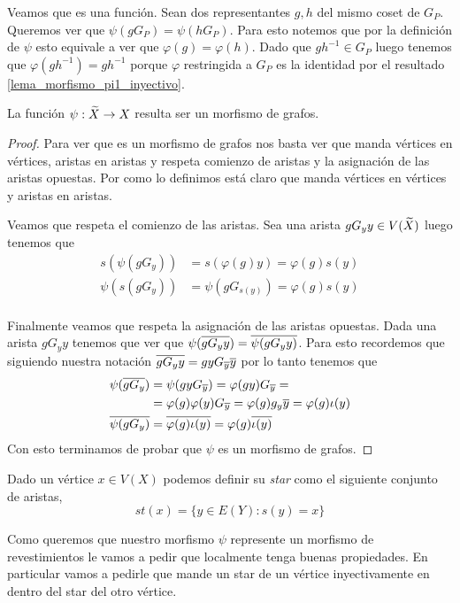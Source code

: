 \documentclass[tesis.tex]{subfiles}
\begin{document}
Veamos que es una función.
Sean dos representantes $g,h$ del mismo coset de $G_P$. 
Queremos ver que $\psi(gG_P) = \psi(hG_P)$.
Para esto notemos que por la definición de $\psi$  esto equivale a ver que $\varphi(g) = \varphi(h)$.
Dado que $gh^{-1} \in G_P$ luego tenemos que $\varphi(gh^{-1}) = gh^{-1}$ porque $\varphi$ restringida a $G_P$ es la identidad por el resultado \ref{lema_morfismo_pi1_inyectivo}.

\begin{lema}
	La función $\psi: \widetilde X \to X$ resulta ser un morfismo de grafos.
\end{lema}

\begin{proof}
Para ver que es un morfismo de grafos nos basta ver que manda vértices en vértices, aristas en aristas y respeta comienzo de aristas y la asignación de las aristas opuestas.
Por como lo definimos está claro que manda vértices en vértices y aristas en aristas.

Veamos que respeta el comienzo de las aristas.
Sea una arista $gG_y y \in V(\widetilde X)$ luego tenemos que 
\begin{align*}
s(\psi(gG_y  )) &= s (\varphi(g)  y) =  \varphi(g) s(y) 	\\ 
\psi(s(gG_y ))  &= \psi(gG_{s(y)} ) = \varphi(g){s(y)} \\
\end{align*}	

Finalmente veamos que respeta la asignación de las aristas opuestas.	
Dada una arista $g G_y y$ tenemos que ver que $\psi(\overline{g G_y y}) = \overline{\psi(g G_y y)}$.	
Para esto recordemos que siguiendo nuestra notación $\overline{g G_y y} = gyG_{\overline y} \overline y $ por lo tanto tenemos que 
\begin{align*}
\psi(\overline{gG_y  }) &= \psi(gyG_{\overline y}) = \varphi(gy) G_{\overline y}  =         \\ 
&= \varphi(g)\varphi(y) G_{\overline y}  = \varphi(g) g_y \overline y = \varphi(g) \iota(y) \\
\overline{\psi(gG_y )} &= \overline{ \varphi(g) \iota(y) } = \varphi(g) \overline{ \iota(y)} 
\end{align*}
Con esto terminamos de probar que $\psi$ es un morfismo de grafos.
\end{proof}


Dado un vértice $x \in V(X)$ podemos definir su \emph{star} como el siguiente conjunto de aristas,
\[
	st(x) = \{  y \in E(Y) : s(y) = x  \}
\]

Como queremos que nuestro morfismo $\psi$ represente un morfismo de revestimientos le vamos a pedir que localmente tenga buenas propiedades. 
En particular vamos a pedirle que mande un star de un vértice inyectivamente en dentro del star del otro vértice.
\end{document}
